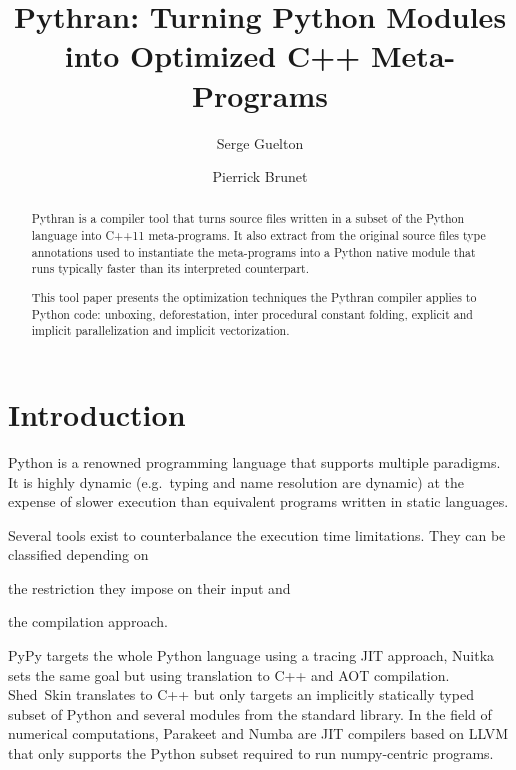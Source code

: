 \documentclass{llncs}
\title{Pythran: Turning Python Modules into Optimized C++ Meta-Programs}
\author{Serge Guelton\inst{1,2} \and Pierrick Brunet\inst{2}}
\institute{\'Ecole Normale Sup\'erieure, D\'epartement d'Informatique, Paris, France
\and
T\'el\'ecom Bretagne, Plouzan\'e, France
}
\begin{document}
\maketitle

\begin{abstract}

    Pythran is a compiler tool that turns source files written in a subset of
    the Python language into C++11 meta-programs. It also extract from the
    original source files type annotations used to instantiate the meta-programs
    into a Python native module that runs typically faster than its interpreted
    counterpart.

    This tool paper presents the optimization techniques the Pythran compiler
    applies to Python code: unboxing, deforestation, inter procedural constant
    folding, explicit and implicit parallelization and implicit vectorization.

\end{abstract}

\section{Introduction}

Python is a renowned programming language that supports multiple paradigms. It
is highly dynamic (e.g.\ typing and name resolution are dynamic) at the expense
of slower execution than equivalent programs written in static languages.

Several tools exist to counterbalance the execution time limitations. They can
be classified depending on
\begin{inparaenum}[1)]
\item the restriction they impose on their input and
\item the compilation approach.
\end{inparaenum}
PyPy\cite{pypy2009} targets the whole Python
language using a tracing \ac{JIT} approach, Nuitka\cite{nuitka2012} sets the same
goal but using translation to C++ and \ac{AOT} compilation.
Shed~Skin\cite{shedskin2006} translates to C++ but only targets an implicitly statically
typed subset of Python and several modules from the standard library. In the
field of numerical computations, Parakeet\cite{parakeet2012} and
Numba\cite{numba2013} are \ac{JIT} compilers based on LLVM that
only supports the Python subset required to run numpy-centric programs.
\end{document}
